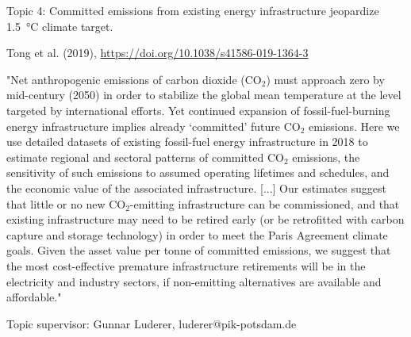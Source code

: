 \documentclass[10pt,aspectratio=169,dvipsnames]{beamer}
\begin{document}
\begin{frame}
  \begin{block}{Topic 4:  Committed emissions from existing energy infrastructure jeopardize 1.5~°C climate target.}
      
    Tong et al. (2019), 
    \href{https://doi.org/10.1038/s41586-019-1364-3 }{https://doi.org/10.1038/s41586-019-1364-3}
    
    "Net anthropogenic emissions of carbon dioxide (CO$_2$) must approach zero by mid-century (2050) in order to stabilize the global mean temperature at the level targeted by international efforts. Yet continued expansion of fossil-fuel-burning energy infrastructure implies already ‘committed’ future CO$_2$ emissions. Here we use detailed datasets of existing fossil-fuel energy infrastructure in 2018 to estimate regional and sectoral patterns of committed CO$_2$ emissions, the sensitivity of such emissions to assumed operating lifetimes and schedules, and the economic value of the associated infrastructure. [...] Our estimates suggest that little or no new CO$_2$-emitting infrastructure can be commissioned, and that existing infrastructure may need to be retired early (or be retrofitted with carbon capture and storage technology) in order to meet the Paris Agreement climate goals. Given the asset value per tonne of committed emissions, we suggest that the most cost-effective premature infrastructure retirements will be in the electricity and industry sectors, if non-emitting alternatives are available and affordable."

    \hfill
    Topic supervisor: Gunnar Luderer, luderer@pik-potsdam.de
    
  \end{block}
\end{frame}
\end{document}
